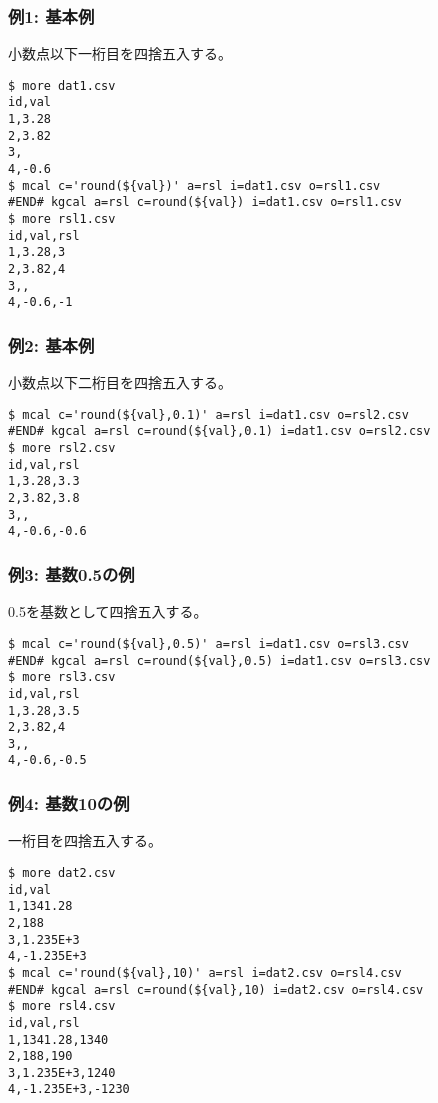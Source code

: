 \subsubsection*{例1: 基本例}

小数点以下一桁目を四捨五入する。


\begin{Verbatim}[baselinestretch=0.7,frame=single]
$ more dat1.csv
id,val
1,3.28
2,3.82
3,
4,-0.6
$ mcal c='round(${val})' a=rsl i=dat1.csv o=rsl1.csv
#END# kgcal a=rsl c=round(${val}) i=dat1.csv o=rsl1.csv
$ more rsl1.csv
id,val,rsl
1,3.28,3
2,3.82,4
3,,
4,-0.6,-1
\end{Verbatim}
\subsubsection*{例2: 基本例}

小数点以下二桁目を四捨五入する。


\begin{Verbatim}[baselinestretch=0.7,frame=single]
$ mcal c='round(${val},0.1)' a=rsl i=dat1.csv o=rsl2.csv
#END# kgcal a=rsl c=round(${val},0.1) i=dat1.csv o=rsl2.csv
$ more rsl2.csv
id,val,rsl
1,3.28,3.3
2,3.82,3.8
3,,
4,-0.6,-0.6
\end{Verbatim}
\subsubsection*{例3: 基数0.5の例}

0.5を基数として四捨五入する。


\begin{Verbatim}[baselinestretch=0.7,frame=single]
$ mcal c='round(${val},0.5)' a=rsl i=dat1.csv o=rsl3.csv
#END# kgcal a=rsl c=round(${val},0.5) i=dat1.csv o=rsl3.csv
$ more rsl3.csv
id,val,rsl
1,3.28,3.5
2,3.82,4
3,,
4,-0.6,-0.5
\end{Verbatim}
\subsubsection*{例4: 基数10の例}

一桁目を四捨五入する。


\begin{Verbatim}[baselinestretch=0.7,frame=single]
$ more dat2.csv
id,val
1,1341.28
2,188
3,1.235E+3
4,-1.235E+3
$ mcal c='round(${val},10)' a=rsl i=dat2.csv o=rsl4.csv
#END# kgcal a=rsl c=round(${val},10) i=dat2.csv o=rsl4.csv
$ more rsl4.csv
id,val,rsl
1,1341.28,1340
2,188,190
3,1.235E+3,1240
4,-1.235E+3,-1230
\end{Verbatim}
